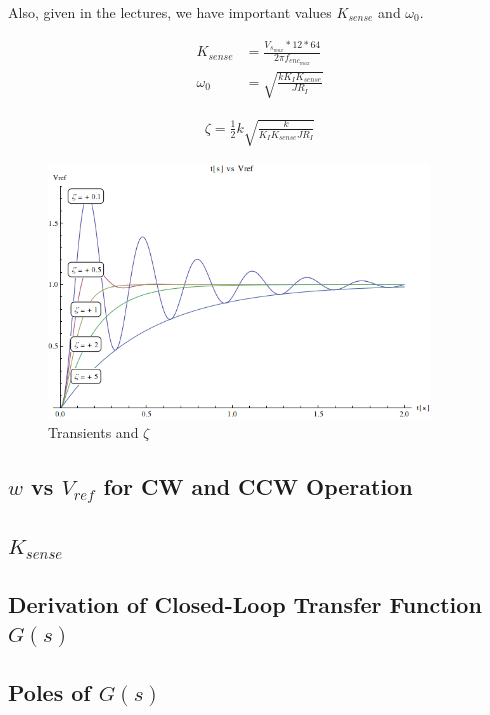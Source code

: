 \documentclass{hw}
\begin{document}
Also, given in the lectures, we have important values $K_{sense}$
and $\omega_0$.

\begin{align*}
  K_{sense} &= \frac{V_{s_{max}}*12*64}{2 \pi f_{enc_{max}}}
  \\ \omega_0 &= \sqrt{\frac{k K_I K_{sense}}{J R_I}}
\end{align*}



\begin{align*}
  \zeta = \frac{1}{2} k \sqrt{\frac{k}{K_I K_{sense} J R_I}}
\end{align*}

\begin{figure}[ht]
  \centering
  \includegraphics[width=0.9\textwidth]{./img/damping.png}
  \caption{Transients and $\zeta$}
  \label{fig:transient}
\end{figure}

\subsection{$w$ vs $V_{ref}$ for CW and CCW Operation}

\subsection{$K_{sense}$}
\subsection{Derivation of Closed-Loop Transfer Function $G(s)$}
\subsection{Poles of $G(s)$}
\end{document}

